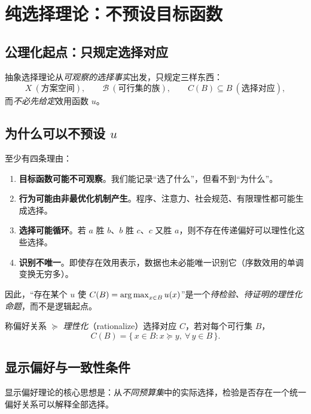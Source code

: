 \section{纯选择理论：不预设目标函数}

\subsection{公理化起点：只规定选择对应}

抽象选择理论从\emph{可观察的选择事实}出发，只规定三样东西：
\[
X\ (\text{方案空间}),\qquad \mathcal{B}\ (\text{可行集的族}),\qquad C(B)\subseteq B\ (\text{选择对应}),
\]
而\emph{不必先给定}效用函数 $u$。

\subsection{为什么可以不预设 \texorpdfstring{$u$}{u}}

至少有四条理由：
\begin{enumerate}
  \item \textbf{目标函数可能不可观察}。我们能记录“选了什么”，但看不到“为什么”。
  \item \textbf{行为可能由非最优化机制产生}。程序、注意力、社会规范、有限理性都可能生成选择。
  \item \textbf{选择可能循环}。若 $a$ 胜 $b$、$b$ 胜 $c$、$c$ 又胜 $a$，则不存在传递偏好可以理性化这些选择。
  \item \textbf{识别不唯一}。即使存在效用表示，数据也未必能唯一识别它（序数效用的单调变换无穷多）。
\end{enumerate}

因此，“存在某个 $u$ 使 $C(B)=\operatorname*{arg\,max}_{x\in B}u(x)$”是一个\emph{待检验、待证明的理性化命题}，而不是逻辑起点。

\begin{definition}[理性化]
称偏好关系 $\succeq$ \emph{理性化}（rationalize）选择对应 $C$，若对每个可行集 $B$，
\[
C(B)=\{\,x\in B : x\succeq y,\ \forall\, y\in B\,\}.
\]
\end{definition}

\subsection{显示偏好与一致性条件}

显示偏好理论的核心思想是：从\emph{不同预算集}中的实际选择，检验是否存在一个统一偏好关系可以解释全部选择。

